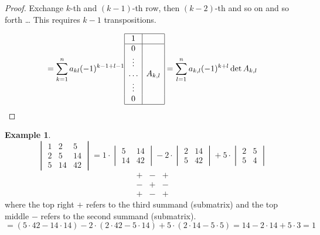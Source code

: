 \documentclass[a4paper,landscape,twocolumn]{article}
\theoremstyle{definition}
\newtheorem{ex}{Example}
\begin{document}
\begin{proof}
  Exchange $k$-th and $(k-1)$-th row, then $(k-2)$-th and so on and so forth \dots
  This requires $k-1$ transpositions.

  \[
    = \sum_{k=1}^n a_{kl} (-1)^{k-1+l-1}
    \begin{array}{|c|c|}
    \hline
      1 & \\
    \hline
      0 & \\
      \vdots & \\
      \ldots & A_{k,l} \\
      \vdots & \\
      0 & \\
    \hline
    \end{array}
    = \sum_{l=1}^n a_{k,l} (-1)^{k+l} \det{A_{k,l}}
  \]
\end{proof}

\begin{ex}
  \[
    \begin{vmatrix}
      1 & 2 & 5 \\
      2 & 5 & 14 \\
      5 & 14 & 42
    \end{vmatrix}
    =
    1 \cdot \begin{vmatrix}
      5 & 14 \\
      14 & 42
    \end{vmatrix} - 2 \cdot \begin{vmatrix}
      2 & 14 \\
      5 & 42
    \end{vmatrix} + 5 \cdot \begin{vmatrix}
      2 & 5 \\
      5 & 4
    \end{vmatrix}
  \] \[
    \begin{array}{|c|c|c|}
      + & - & + \\
    \hline
      - & + & - \\
    \hline
      + & - & +
    \end{array}
  \]
  where the top right $+$ refers to the third summand (submatrix)
  and the top middle $-$ refers to the second summand (submatrix).
  \[
    = (5 \cdot 42 - 14\cdot 14) - 2 \cdot (2 \cdot 42 - 5 \cdot 14) + 5 \cdot (2 \cdot 14 - 5 \cdot 5)
    = 14 - 2 \cdot 14 + 5 \cdot 3 = 1
  \]
\end{ex}
\end{document}

